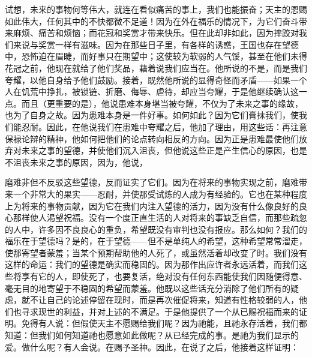 \par

试想，未来的事物何等伟大，就连在看似痛苦的事上，我们也能振奋；天主的恩赐如此伟大，任何其中的不快都微不足道！因为在外在福乐的情况下，为它们奋斗带来麻烦、痛苦和烦恼；而花冠和奖赏才带来快乐。但在此却非如此，因为摔跤对我们来说与奖赏一样有滋味。因为在那些日子里，有各样的诱惑，王国也存在望德中，恐怖迫在眉睫，而好事只在期望中；这使较为软弱的人气馁，甚至在他们未得花冠之前，他现在就给了他们奖品，藉着说我们应当在。他所说的不是，而是我们夸耀，以他自身给予他们鼓励。接着，既然他所说的显得奇怪而矛盾——如果一个人在饥荒中挣扎，被锁链、折磨、侮辱、虐待，却应当夸耀，于是他继续确认这一点。而且（更重要的是），他说患难本身堪当被夸耀，不仅为了未来之事的缘故，也为了自身之故。因为患难本身是一件好事。如何如此？因为它们膏抹我们，使我们能忍耐。因此，在他说我们在患难中夸耀之后，他加了理由，用这些话：再注意保禄论辩的精神，他如何把他们的论点转向相反的方向。因为正是患难最使他们放弃对未来之事的望德，并使他们沉入沮丧，但他说这些正是产生信心的原因，也是不沮丧未来之事的原因，因为，他说，\par

\par

磨难非但不反驳这些望德，反而证实了它们。因为在将来的事物实现之前，磨难带来一个非常大的果实——忍耐，并使那受试炼的人成为有经验的。它也在某种程度上为将来的事物贡献，因为它在我们内注入望德的活力，因为没有什么像良好的良心那样使人渴望祝福。没有一个度正直生活的人对将来的事缺乏自信，而那些疏忽的人中，许多因不良良心的重负，希望既没有审判也没有报应。那么如何？我们的福乐在于望德吗？是的，在于望德——但不是单纯人的希望，这种希望常常溜走，使那寄望者蒙羞；当某个预期帮助他的人死了，或虽然活着却改变了时。我们没有这样的命运：我们的望德是确实而稳固的。因为那作出应许者永远活着，而我们这些将享有它的人，即使死了，也要复活，绝对没有任何东西能使我们因随便得意、毫无目的地寄望于不稳固的希望而蒙羞。他既以这些话充分消除了他们所有的疑虑，就不让自己的论述停留在现时，而是再次催促将来，知道有性格较弱的人，他们也寻求现世的利益，并对上述的不满足。于是他提供了一个从已赐祝福而来的证明。免得有人说：但假使天主不愿赐给我们呢？因为祂能，且祂永存活着，我们都知道：但我们如何知道祂也愿意如此做呢？从已经完成的事。是祂为我们显示的爱。做什么呢？有人会说。在赐予圣神。因此，在说了之后，他接着这样证明：\par

